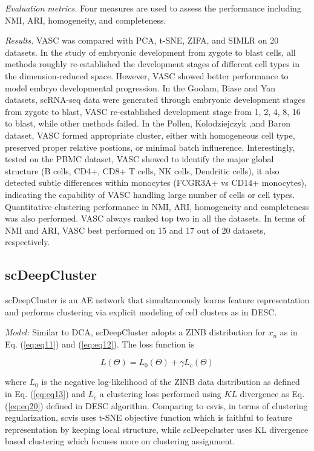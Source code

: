 \documentclass[
]{book}
\begin{document}
\emph{Evaluation metrics.} Four measures are used to assess the performance including NMI, ARI, homogeneity, and completeness.

\emph{Results.} VASC was compared with PCA, t-SNE, ZIFA, and SIMLR on 20 datasets. In the study of embryonic development from zygote to blast cells, all methods roughly re-established the development stages of different cell types in the dimension-reduced space. However, VASC showed better performance to model embryo developmental progression. In the Goolam, Biase and Yan datasets, scRNA-seq data were generated through embryonic development stages from zygote to blast, VASC re-established development stage from 1, 2, 4, 8, 16 to blast, while other methods failed. In the Pollen, Kolodziejczyk ,and Baron dataset, VASC formed appropriate cluster, either with homogeneous cell type, preserved proper relative postions, or minimal batch influerence. Interestingly, tested on the PBMC dataset, VASC showed to identify the major global structure (B cells, CD4+, CD8+ T cells, NK cells, Dendritic cells), it also detected subtle differences within monocytes (FCGR3A+ vs CD14+ monocytes), indicating the capability of VASC handling large number of cells or cell types. Quantitative clustering performance in NMI, ARI, homogeneity and completeness was also performed. VASC always ranked top two in all the datasets. In terms of NMI and ARI, VASC best performed on 15 and 17 out of 20 datasets, respectively.

\hypertarget{ch-5-3-6}{%
\subsection{scDeepCluster}\label{ch-5-3-6}}

scDeepCluster \citep{RN133} is an AE network that simultaneously learns feature representation and performs clustering via explicit modeling of cell clusters as in DESC.

\emph{Model:} Similar to DCA, scDeepCluster adopts a ZINB distribution for \(x_{n}\) as in Eq. (\eqref{eq:eq11}) and (\eqref{eq:eq12}). The loss function is

\begin{equation}
L(\Theta)=L_{0}(\Theta)+\gamma L_{c}(\Theta) \label{eq:eq30}
\end{equation}

where \(L_{0}\) is the negative log-likelihood of the ZINB data distribution as defined in Eq. (\eqref{eq:eq13}) and \(L_{c}\) a clustering loss performed using \(KL\) divergence as Eq. (\eqref{eq:eq20}) defined in DESC algorithm. Comparing to csvis, in terms of clustering regularization, scvis uses t-SNE objective function which is faithful to feature representation by keeping local structure, while scDeepcluster uses KL divergence based clustering which focuses more on clustering assignment.
\end{document}
